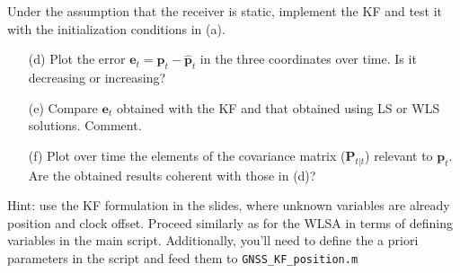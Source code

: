 \documentclass[11pt]{article}
\begin{document}
Under the assumption that the receiver is static, implement the KF and test it with the initialization conditions in (a).
\begin{enumerate}
\item[(d)] Plot the error $\mathbf{e}_t = \mathbf{p}_t - \hat{\mathbf{p}}_t$ in the three coordinates over time. Is it decreasing or increasing?
\item[(e)] Compare $\mathbf{e}_t$ obtained with the KF and that obtained using LS or WLS solutions. Comment.
\item[(f)] Plot over time the elements of the covariance matrix ($\mathbf{P}_{t|t}$) relevant to $\mathbf{p}_t$. Are the obtained results coherent with those in (d)?
\end{enumerate}


Hint: use the KF formulation in the slides, where unknown variables are already position and clock offset. Proceed similarly as for the WLSA in terms of defining variables in the main script. Additionally, you'll need to define the a priori parameters in the script and feed them to \verb|GNSS_KF_position.m|
\end{document}
